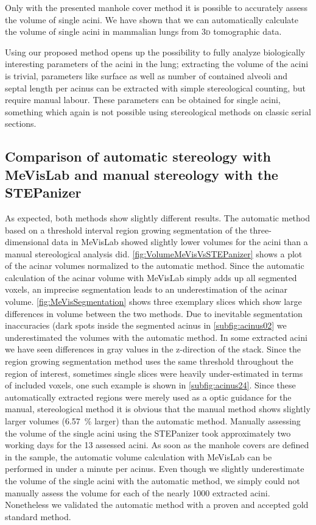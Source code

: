 \documentclass[%
	paper=a4,%
	abstract=true,%
	]{scrartcl}
\newcommand{\threed}{3\textsc{d}\xspace}
\begin{document}
Only with the presented manhole cover method it is possible to accurately assess the volume of single acini. We have shown that we can automatically calculate the volume of single acini in mammalian lungs from \threed tomographic data.

Using our proposed method opens up the possibility to fully analyze biologically interesting parameters of the acini in the lung; extracting the volume of the acini is trivial, parameters like surface as well as number of contained alveoli and septal length per acinus can be extracted with simple stereological counting, but require manual labour. These parameters can be obtained for single acini, something which again is not possible using stereological methods on classic serial sections.

\subsection[Comparison of MeVisLab with STEPanizer]{Comparison of automatic stereology with MeVisLab and manual stereology with the STEPanizer\label{subsec:MeVisVsSTEPanizer}}
As expected, both methods show slightly different results. The automatic method based on a threshold interval region growing segmentation of the three-dimensional data in MeVisLab showed slightly lower volumes for the acini than a manual stereological analysis did. \autoref{fig:VolumeMeVisVsSTEPanizer} shows a plot of the acinar volumes normalized to the automatic method. Since the automatic calculation of the acinar volume with MeVisLab simply adds up all segmented voxels, an imprecise segmentation leads to an underestimation of the acinar volume. \autoref{fig:MeVisSegmentation} shows three exemplary slices which show large differences in volume between the two methods. Due to inevitable segmentation inaccuracies (dark spots inside the segmented acinus in \autoref{subfig:acinus02} we underestimated the volumes with the automatic method. In some extracted acini we have seen differences in gray values in the z-direction of the stack. Since the region growing segmentation method uses the same threshold throughout the region of interest, sometimes single slices were heavily under-estimated in terms of included voxels, one such example is shown in \autoref{subfig:acinus24}. Since these automatically extracted regions were merely used as a optic guidance for the manual, stereological method it is obvious that the manual method shows slightly larger volumes (\SI{6.57}{\percent} larger) than the automatic method. Manually assessing the volume of the single acini using the STEPanizer took approximately two working days for the 13 assessed acini. As soon as the manhole covers are defined in the sample, the automatic volume calculation with MeVisLab can be performed in under a minute per acinus. Even though we slightly underestimate the volume of the single acini with the automatic method, we simply could not manually assess the volume for each of the nearly 1000 extracted acini. Nonetheless we validated the automatic method with a proven and accepted gold standard method.
\end{document}
